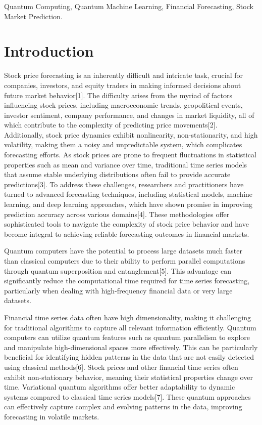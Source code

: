 \documentclass[conference]{IEEEtran}
\begin{document}
\begin{IEEEkeywords}
Quantum Computing, Quantum Machine Learning, Financial Forecasting, Stock Market Prediction.
\end{IEEEkeywords}

\section{Introduction}
Stock price forecasting is an inherently difficult and intricate task, crucial for companies, investors, and equity traders in making informed decisions about future market behavior[1]. The difficulty arises from the myriad of factors influencing stock prices, including macroeconomic trends, geopolitical events, investor sentiment, company performance, and changes in market liquidity, all of which contribute to the complexity of predicting price movements[2]. Additionally, stock price dynamics exhibit nonlinearity, non-stationarity, and high volatility, making them a noisy and unpredictable system, which complicates forecasting efforts. As stock prices are prone to frequent fluctuations in statistical properties such as mean and variance over time, traditional time series models that assume stable underlying distributions often fail to provide accurate predictions[3]. To address these challenges, researchers and practitioners have turned to advanced forecasting techniques, including statistical models, machine learning, and deep learning approaches, which have shown promise in improving prediction accuracy across various domains[4]. These methodologies offer sophisticated tools to navigate the complexity of stock price behavior and have become integral to achieving reliable forecasting outcomes in financial markets.

Quantum computers have the potential to process large datasets much faster than classical computers due to their ability to perform parallel computations through quantum superposition and entanglement[5]. This advantage can significantly reduce the computational time required for time series forecasting, particularly when dealing with high-frequency financial data or very large datasets.

Financial time series data often have high dimensionality, making it challenging for traditional algorithms to capture all relevant information efficiently. Quantum computers can utilize quantum features such as quantum parallelism to explore and manipulate high-dimensional spaces more effectively. This can be particularly beneficial for identifying hidden patterns in the data that are not easily detected using classical methods[6].
Stock prices and other financial time series often exhibit non-stationary behavior, meaning their statistical properties change over time. Variational quantum algorithms offer better adaptability to dynamic systems compared to classical time series models[7]. These quantum approaches can effectively capture complex and evolving patterns in the data, improving forecasting in volatile markets.
\end{document}
